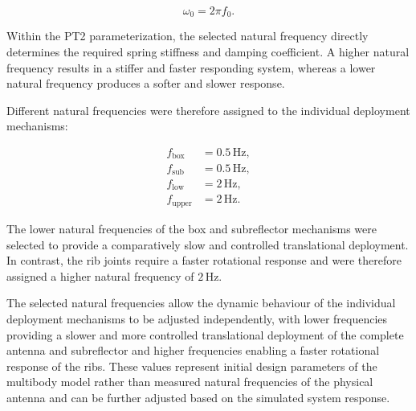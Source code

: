 	\begin{equation}
		\omega_0 = 2\pi f_0.
	\end{equation}
	
	Within the PT2 parameterization, the selected natural frequency directly determines the required spring stiffness and damping coefficient. A higher natural frequency results in a stiffer and faster responding system, whereas a lower natural frequency produces a softer and slower response.
	
	Different natural frequencies were therefore assigned to the individual deployment mechanisms:
	
	\begin{align}
		f_{\mathrm{box}} &= 0.5\,\mathrm{Hz},\\
		f_{\mathrm{sub}} &= 0.5\,\mathrm{Hz},\\
		f_{\mathrm{low}} &= 2\,\mathrm{Hz},\\
		f_{\mathrm{upper}} &= 2\,\mathrm{Hz}.
	\end{align}
	
	The lower natural frequencies of the box and subreflector mechanisms were selected to provide a comparatively slow and controlled translational deployment. In contrast, the rib joints require a faster rotational response and were therefore assigned a higher natural frequency of $2\,\mathrm{Hz}$.
	
	
	The selected natural frequencies allow the dynamic behaviour of the individual deployment mechanisms to be adjusted independently, with lower frequencies providing a slower and more controlled translational deployment of the complete antenna and subreflector and higher frequencies enabling a faster rotational response of the ribs. These values represent initial design parameters of the multibody model rather than measured natural frequencies of the physical antenna and can be further adjusted based on the simulated system response.
	
	
	
